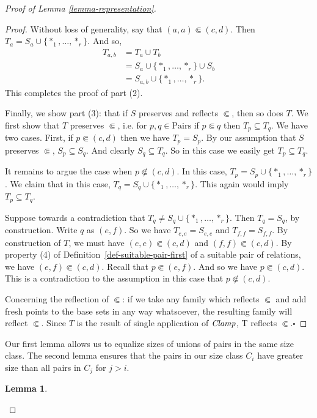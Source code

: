 \documentclass[letterpaper]{article}
\newtheorem{lemma}[theorem]{Lemma}
\theoremstyle{definition}
\newcommand{\set}[1]{\{ #1 \}}
\newcommand{\Pairs}{\mbox{Pairs}}
\newcommand{\Clamp}{\protect{\mbox{\textit{Clamp}}}}
\newcommand{\precsubseteq}{\Subset}
\begin{document}
\begin{proof}[Proof of Lemma \ref{lemma-representation}]
\begin{proof}
Without loss of generality, say that $(a,a) \precsubseteq (c,d)$.
Then $T_a = S_a \cup \set{*_1,\ldots, *_r}$.
And so,
\begin{align*} T_{a,b} &= T_a \cup T_b\\ &= S_a\cup\set{*_1,\ldots, *_r} \cup S_b \\&= S_{a,b}\cup\set{*_1,\ldots, *_r}.
\end{align*}
This completes the proof of part (2).

Finally, we show part (3): that if $S$ preserves and reflects $\Subset$, then so does $T$.  We first show that $T$ preserves $\Subset$, i.e. for $p, q \in \Pairs$ if $p \Subset q$ then $T_p \subseteq T_q$.
We have two cases.  First, if $p \precsubseteq (c,d)$ then we have $T_p = S_p$.
By our assumption that $S$ preserves $\precsubseteq$, $S_p \subseteq S_q$.
And clearly $S_q \subseteq T_q$.
So in this case we easily get $T_p \subseteq T_q$.

It remains to argue the case when
$p \not \precsubseteq (c,d)$.  In this case,  
$T_p =  S_p \cup \set{*_1,\ldots, *_r}$.
We claim that in this case,
$T_q =  S_q \cup \set{*_1,\ldots, *_r}$.
This again would imply $T_p \subseteq T_q$.

Suppose towards a contradiction that 
$T_q \neq  S_q \cup \set{*_1,\ldots, *_r}$.
Then $T_q =  S_q $, by construction.  Write $q$ as $(e, f)$.  So we have $T_{e,e} = S_{e,e}$ and $T_{f,f} = S_{f,f}$.
By construction of $T$, we must have $(e,e)\precsubseteq (c, d)$
and   $(f,f)\precsubseteq (c, d)$.
By property (4) of Definition~\ref{def-suitable-pair-first} of a suitable pair of relations, we have $(e,f)\precsubseteq (c, d)$.
Recall that 
$p \precsubseteq (e,f)$. 
And so we have $p \precsubseteq (c, d)$. 
This is a contradiction to the assumption in this case that 
$p \not \precsubseteq (c, d)$.

Concerning the reflection of $\precsubseteq$:
 if we take any family which reflects $\precsubseteq$ and
add fresh points to the base sets
in any way whatsoever, the resulting family will reflect $\precsubseteq$.  Since $T$ is the result of single application of $\Clamp$, T reflects $\precsubseteq$.\hfill$\square$
\end{proof}

Our first lemma allows us to equalize sizes of unions of pairs in the same size class.  The second lemma ensures that the pairs in our size class $C_i$ have greater size than all pairs in 
$C_j$ for $j > i$.

\begin{lemma}


\end{lemma}
\end{proof}
\end{document}
